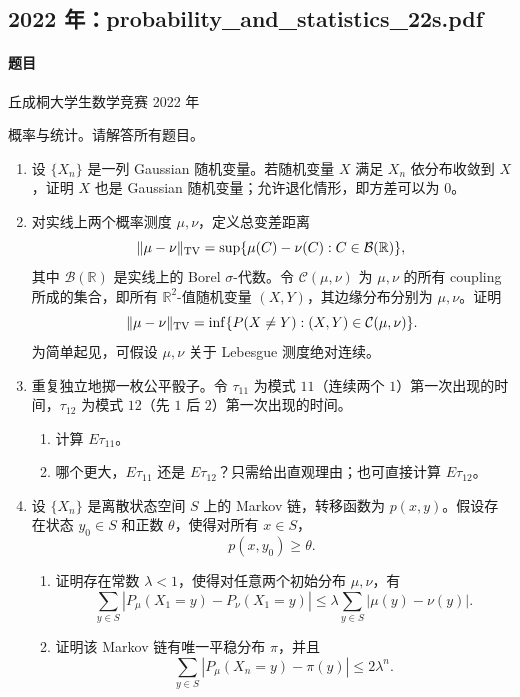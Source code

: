 \documentclass[UTF8,12pt]{ctexart}
\begin{document}
\subsection{2022 年：probability\_and\_statistics\_22s.pdf}
\paragraph{题目}
丘成桐大学生数学竞赛 2022 年

概率与统计。请解答所有题目。

\begin{enumerate}[label=\textbf{\arabic*.},leftmargin=2.2em]
\item 设 \(\{X_n\}\) 是一列 Gaussian 随机变量。若随机变量 \(X\) 满足 \(X_n\) 依分布收敛到 \(X\)，证明 \(X\) 也是 Gaussian 随机变量；允许退化情形，即方差可以为 \(0\)。

\item 对实线上两个概率测度 \(\mu,\nu\)，定义总变差距离
\[
\|\mu-\nu\|_{\rm TV}
=\sup\{\mu(C)-\nu(C):C\in\mathcal B(\mathbb R)\},
\]
其中 \(\mathcal B(\mathbb R)\) 是实线上的 Borel \(\sigma\)-代数。令 \(\mathcal C(\mu,\nu)\) 为 \(\mu,\nu\) 的所有 coupling 所成的集合，即所有 \(\mathbb R^2\)-值随机变量 \((X,Y)\)，其边缘分布分别为 \(\mu,\nu\)。证明
\[
\|\mu-\nu\|_{\rm TV}
=\inf\{P(X\ne Y):(X,Y)\in\mathcal C(\mu,\nu)\}.
\]
为简单起见，可假设 \(\mu,\nu\) 关于 Lebesgue 测度绝对连续。

\item 重复独立地掷一枚公平骰子。令 \(\tau_{11}\) 为模式 \(11\)（连续两个 \(1\)）第一次出现的时间，\(\tau_{12}\) 为模式 \(12\)（先 \(1\) 后 \(2\)）第一次出现的时间。
\begin{enumerate}[label=\textbf{(\alph*)},leftmargin=2.4em]
\item 计算 \(E\tau_{11}\)。
\item 哪个更大，\(E\tau_{11}\) 还是 \(E\tau_{12}\)？只需给出直观理由；也可直接计算 \(E\tau_{12}\)。
\end{enumerate}

\item 设 \(\{X_n\}\) 是离散状态空间 \(S\) 上的 Markov 链，转移函数为 \(p(x,y)\)。假设存在状态 \(y_0\in S\) 和正数 \(\theta\)，使得对所有 \(x\in S\)，
\[
p(x,y_0)\ge\theta.
\]
\begin{enumerate}[label=\textbf{(\alph*)},leftmargin=2.4em]
\item 证明存在常数 \(\lambda<1\)，使得对任意两个初始分布 \(\mu,\nu\)，有
\[
\sum_{y\in S}\left|P_\mu(X_1=y)-P_\nu(X_1=y)\right|
\le \lambda\sum_{y\in S}|\mu(y)-\nu(y)|.
\]
\item 证明该 Markov 链有唯一平稳分布 \(\pi\)，并且
\[
\sum_{y\in S}\left|P_\mu(X_n=y)-\pi(y)\right|\le 2\lambda^n.
\]
\end{enumerate}


\end{enumerate}
\end{document}
